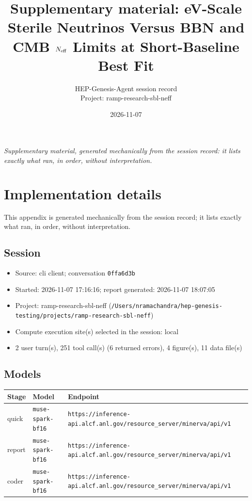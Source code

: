 \documentclass[11pt,a4paper]{article}
\title{Supplementary material: eV-Scale Sterile Neutrinos Versus BBN and CMB $N_{\rm eff}$ Limits at Short-Baseline Best Fit}
\author{HEP-Genesis-Agent session record \\ \small Project: ramp-research-sbl-neff}
\date{2026-11-07}
\begin{document}
\maketitle
\noindent\textit{\small Supplementary material, generated mechanically from the session record: it lists exactly what ran, in order, without interpretation.}
\vspace{1em}



\appendix
\section{Implementation details}
\label{app:impl}
This appendix is generated mechanically from the session record; it lists exactly what ran, in order, without interpretation.
\subsection{Session}
\begin{itemize}
  \item Source: cli client; conversation \texttt{0ffa6d3b}
  \item Started: 2026-11-07 17:16:16; report generated: 2026-11-07 18:07:05
  \item Project: ramp-research-sbl-neff (\texttt{/\allowbreak{}Users/\allowbreak{}nramachandra/\allowbreak{}hep-genesis-testing/\allowbreak{}projects/\allowbreak{}ramp-research-sbl-neff})
  \item Compute execution site(s) selected in the session: local
  \item 2 user turn(s), 251 tool call(s) (6 returned errors), 4 figure(s), 11 data file(s)
\end{itemize}
\subsection{Models}
\begin{longtable}{@{}p{}p{}p{}@{}}
\toprule Stage & Model & Endpoint \\ \midrule \endhead
quick & \texttt{muse-spark-bf16} & \texttt{https:\allowbreak{}/\allowbreak{}/\allowbreak{}inference-api.alcf.anl.gov/\allowbreak{}resource\_\allowbreak{}server/\allowbreak{}minerva/\allowbreak{}api/\allowbreak{}v1} \\
report & \texttt{muse-spark-bf16} & \texttt{https:\allowbreak{}/\allowbreak{}/\allowbreak{}inference-api.alcf.anl.gov/\allowbreak{}resource\_\allowbreak{}server/\allowbreak{}minerva/\allowbreak{}api/\allowbreak{}v1} \\
coder & \texttt{muse-spark-bf16} & \texttt{https:\allowbreak{}/\allowbreak{}/\allowbreak{}inference-api.alcf.anl.gov/\allowbreak{}resource\_\allowbreak{}server/\allowbreak{}minerva/\allowbreak{}api/\allowbreak{}v1} \\
\bottomrule\end{longtable}
\end{document}
